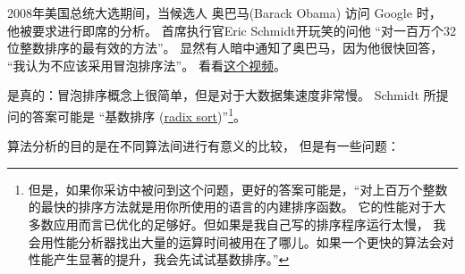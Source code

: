 2008年美国总统大选期间，当候选人 奥巴马(Barack Obama) 访问 Google 时，
他被要求进行即席的分析。  首席执行官Eric Schmidt开玩笑的问他
``对一百万个32位整数排序的最有效的方法''。
显然有人暗中通知了奥巴马，因为他很快回答， ``我认为不应该采用冒泡排序法''。
看看\href{http://www.youtube.com/watch?v=k4RRi_ntQc8}{这个视频}。

    


是真的：冒泡排序概念上很简单，但是对于大数据集速度非常慢。
Schmidt 所提问的答案可能是 ``基数排序 (\href{http://en.wikipedia.org/wiki/Radix_sort}{radix sort})''\footnote{但是，如果你采访中被问到这个问题，更好的答案可能是，``对上百万个整数的最快的排序方法就是用你所使用的语言的内建排序函数。 它的性能对于大多数应用而言已优化的足够好。但如果是我自己写的排序程序运行太慢， 我会用性能分析器找出大量的运算时间被用在了哪儿。如果一个更快的算法会对性能产生显著的提升，我会先试试基数排序。''}。


算法分析的目的是在不同算法间进行有意义的比较， 但是有一些问题：

